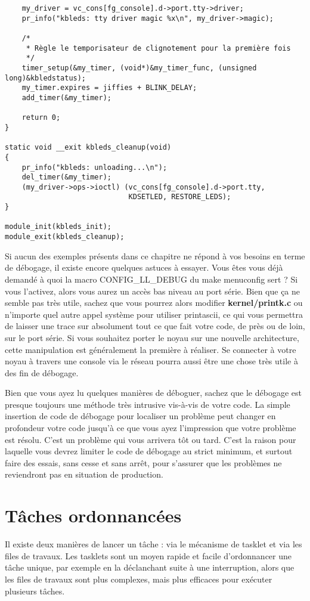 \documentclass[11pt]{article}
\begin{document}
\begin{verbatim}
    my_driver = vc_cons[fg_console].d->port.tty->driver;
    pr_info("kbleds: tty driver magic %x\n", my_driver->magic);

    /*
     * Règle le temporisateur de clignotement pour la première fois
     */
    timer_setup(&my_timer, (void*)&my_timer_func, (unsigned long)&kbledstatus);
    my_timer.expires = jiffies + BLINK_DELAY;
    add_timer(&my_timer);

    return 0;
}

static void __exit kbleds_cleanup(void)
{
    pr_info("kbleds: unloading...\n");
    del_timer(&my_timer);
    (my_driver->ops->ioctl) (vc_cons[fg_console].d->port.tty,
                             KDSETLED, RESTORE_LEDS);
}

module_init(kbleds_init);
module_exit(kbleds_cleanup);
\end{verbatim}

Si aucun des exemples présents dans ce chapitre ne répond à vos besoins en terme de débogage, il existe encore quelques astuces à essayer. Vous êtes vous déjà demandé à quoi la macro CONFIG\_LL\_DEBUG du make menuconfig sert ? Si vous l'activez, alors vous aurez un accès bas niveau au port série. Bien que ça ne semble pas très utile, sachez que vous pourrez alors modifier \textbf{kernel/printk.c} ou n'importe quel autre appel système pour utiliser printascii, ce qui vous permettra de laisser une trace sur absolument tout ce que fait votre code, de près ou de loin, sur le port série. Si vous souhaitez porter le noyau sur une nouvelle architecture, cette manipulation est généralement la première à réaliser. Se connecter à votre noyau à travers une console via le réseau pourra aussi être une chose très utile à des fin de débogage.

Bien que vous ayez lu quelques manières de déboguer, sachez que le débogage est presque toujours une méthode très intrusive vis-à-vis de votre code. La simple insertion de code de débogage pour localiser un problème peut changer en profondeur votre code jusqu'à ce que vous ayez l'impression que votre problème est résolu. C'est un problème qui vous arrivera tôt ou tard. C'est la raison pour laquelle vous devrez limiter le code de débogage au strict minimum, et surtout faire des essais, sans cesse et sans arrêt, pour s'assurer que les problèmes ne reviendront pas en situation de production.

\section*{Tâches ordonnancées}
\label{sec-14}
Il existe deux manières de lancer un tâche : via le mécanisme de tasklet et via les files de travaux. Les tasklets sont un moyen rapide et facile d'ordonnancer une tâche unique, par exemple en la déclanchant suite à une interruption, alors que les files de travaux sont plus complexes, mais plus efficaces pour exécuter plusieurs tâches.
\end{document}
